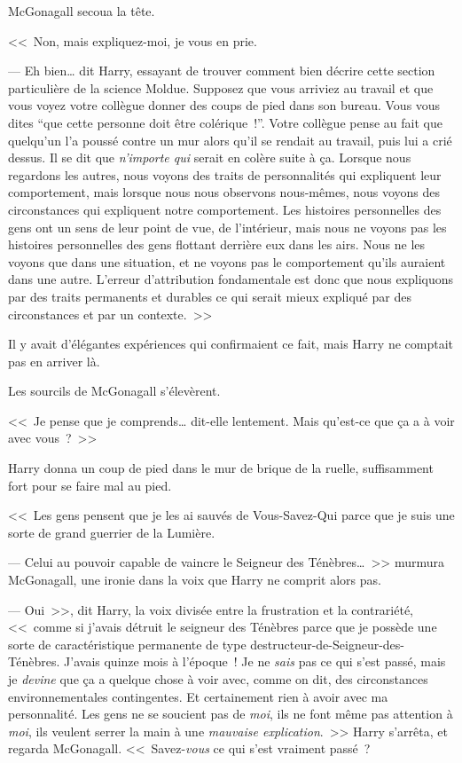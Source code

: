 McGonagall secoua la tête.

<<~Non, mais expliquez-moi, je vous en prie.

--- Eh bien… dit Harry, essayant de trouver comment bien décrire cette section particulière de la science Moldue. Supposez que vous arriviez au travail et que vous voyez votre collègue donner des coups de pied dans son bureau. Vous vous dites “que cette personne doit être colérique~!”. Votre collègue pense au fait que quelqu'un l'a poussé contre un mur alors qu'il se rendait au travail, puis lui a crié dessus. Il se dit que \emph{n'importe qui} serait en colère suite à ça. Lorsque nous regardons les autres, nous voyons des traits de personnalités qui expliquent leur comportement, mais lorsque nous nous observons nous-mêmes, nous voyons des circonstances qui expliquent notre comportement. Les histoires personnelles des gens ont un sens de leur point de vue, de l'intérieur, mais nous ne voyons pas les histoires personnelles des gens flottant derrière eux dans les airs. Nous ne les voyons que dans une situation, et ne voyons pas le comportement qu'ils auraient dans une autre. L'erreur d'attribution fondamentale est donc que nous expliquons par des traits permanents et durables ce qui serait mieux expliqué par des circonstances et par un contexte.~>>

Il y avait d'élégantes expériences qui confirmaient ce fait, mais Harry ne comptait pas en arriver là.

Les sourcils de McGonagall s'élevèrent.

<<~Je pense que je comprends… dit-elle lentement. Mais qu'est-ce que ça a à voir avec vous~?~>>

Harry donna un coup de pied dans le mur de brique de la ruelle, suffisamment fort pour se faire mal au pied. 

<<~Les gens pensent que je les ai sauvés de Vous-Savez-Qui parce que je suis une sorte de grand guerrier de la Lumière.

--- Celui au pouvoir capable de vaincre le Seigneur des Ténèbres…~>> murmura McGonagall, une ironie dans la voix que Harry ne comprit alors pas.

--- Oui~>>, dit Harry, la voix divisée entre la frustration et la contrariété, <<~comme si j'avais détruit le seigneur des Ténèbres parce que je possède une sorte de caractéristique permanente de type destructeur-de-Seigneur-des-Ténèbres. J'avais quinze mois à l'époque~! Je ne \emph{sais} pas ce qui s'est passé, mais je \emph{devine} que ça a quelque chose à voir avec, comme on dit, des circonstances environnementales contingentes. Et certainement rien à avoir avec ma personnalité. Les gens ne se soucient pas de \emph{moi}, ils ne font même pas attention à \emph{moi}, ils veulent serrer la main à une \emph{mauvaise explication}.~>> Harry s'arrêta, et regarda McGonagall. <<~Savez-\emph{vous} ce qui s'est vraiment passé~?


